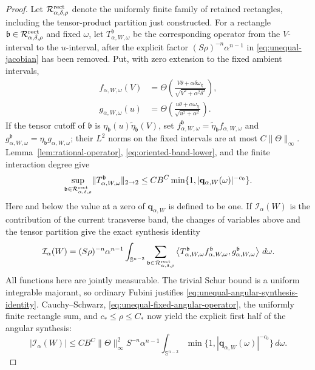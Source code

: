 \documentclass[11pt]{article}
\numberwithin{equation}{section}
\theoremstyle{remark}
\theoremstyle{definition}
\newcommand{\Sph}{\mathbb S}
\newcommand{\norm}[1]{\lVert #1\rVert}
\begin{document}
\begin{proof}
Let $\mathcal R_{\alpha,\delta,\rho}^{\rm rect}$ denote the uniformly finite family
of retained rectangles, including the tensor-product partition just
constructed.  For a rectangle
$\mathfrak b\in\mathcal R_{\alpha,\delta,\rho}^{\rm rect}$ and
fixed $\omega$, let $T^{\mathfrak b}_{\alpha,W,\omega}$ be the corresponding operator
from the $V$-interval to the $u$-interval, after the explicit factor
$(S\rho)^{-n}\alpha^{n-1}$ in
\eqref{eq:unequal-jacobian} has been removed.  Put, with zero extension
to the fixed ambient intervals,
\begin{align*}
 f_{\alpha,W,\omega}(V)
 &=\Theta\left(\frac{V\theta+\alpha\delta\omega_\chi}
                 {\sqrt{V^2+\alpha^2\delta^2}}\right),\\
 g_{\alpha,W,\omega}(u)
 &=\Theta\left(\frac{u\theta+\alpha\omega_\chi}
                 {\sqrt{u^2+\alpha^2}}\right).
\end{align*}
If the tensor cutoff of $\mathfrak b$ is
$\eta_{\mathfrak b}(u)\widetilde\eta_{\mathfrak b}(V)$, set
$f^{\mathfrak b}_{\alpha,W,\omega}
=\widetilde\eta_{\mathfrak b}f_{\alpha,W,\omega}$ and
$g^{\mathfrak b}_{\alpha,W,\omega}
=\eta_{\mathfrak b}g_{\alpha,W,\omega}$; their $L^2$ norms on the fixed
intervals are at most $C\norm\Theta_\infty$.  Lemma~\ref{lem:rational-operator},
\eqref{eq:oriented-band-lower}, and the finite interaction degree give
\begin{equation}\label{eq:unequal-fixed-angular-operator}
 \sup_{\mathfrak b\in\mathcal R_{\alpha,\delta,\rho}^{\rm rect}}
 \norm{T^{\mathfrak b}_{\alpha,W,\omega}}_{2\to2}
 \le CB^C\min\{1,|\mathbf q_{\alpha,W}(\omega)|^{-c_0}\}.
\end{equation}
Here and below the value at a zero of $\mathbf q_{\alpha,W}$ is defined to
be one.  If $\mathcal I_\alpha(W)$ is the contribution of the current
transverse band, the changes of variables above and the tensor partition
give the exact synthesis identity
\begin{equation}\label{eq:unequal-angular-synthesis-identity}
 \mathcal I_\alpha(W)
 =(S\rho)^{-n}\alpha^{n-1}
 \int_{\Sph^{n-2}}
  \sum_{\mathfrak b\in\mathcal R_{\alpha,\delta,\rho}^{\rm rect}}
  \left\langle T^{\mathfrak b}_{\alpha,W,\omega}
       f^{\mathfrak b}_{\alpha,W,\omega},
       g^{\mathfrak b}_{\alpha,W,\omega}\right\rangle
 \,d\omega.
\end{equation}
All functions here are jointly measurable.  The trivial Schur bound is a
uniform integrable majorant, so ordinary Fubini justifies
\eqref{eq:unequal-angular-synthesis-identity}.  Cauchy--Schwarz,
\eqref{eq:unequal-fixed-angular-operator}, the uniformly finite rectangle
sum, and $c_*\le\rho\le C_*$ now yield the explicit first half of the
angular synthesis:
\begin{equation}\label{eq:unequal-angular-synthesis-first}
 |\mathcal I_\alpha(W)|
 \le CB^C\norm\Theta_\infty^2S^{-n}\alpha^{n-1}
 \int_{\Sph^{n-2}}
  \min\{1,|\mathbf q_{\alpha,W}(\omega)|^{-c_0}\}\,d\omega.
\end{equation}


\end{proof}
\end{document}
